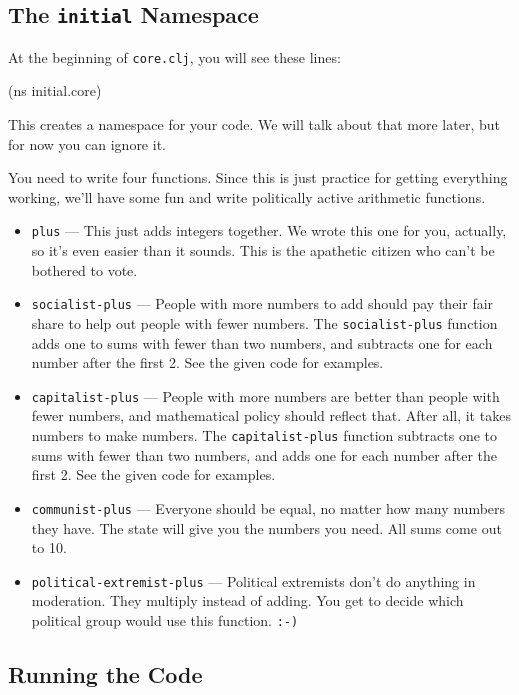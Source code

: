 \documentclass[12pt]{article}
\begin{document}
\subsection{The \texttt{initial} Namespace}

At the beginning of \texttt{core.clj}, you will see these lines:

\begin{clojurecode}
(ns initial.core)
\end{clojurecode}

This creates a namespace for your code.  We will talk about that more later, but for now you can
ignore it.

You need to write four functions.  Since this is just practice for getting everything working, we'll
have some fun and write politically active arithmetic functions.

\begin{itemize}
   \item \texttt{plus} --- This just adds integers together.  We wrote this one for you, actually, so it's even
      easier than it sounds.  This is the apathetic citizen who can't be bothered to vote.
   \item \texttt{socialist-plus} ---  People with more numbers to add should pay their fair share to help out
      people with fewer numbers.  The \texttt{socialist-plus} function adds one to sums with fewer than two
      numbers, and subtracts one for each number after the first 2.  See the given code for examples.
   \item \texttt{capitalist-plus} ---  People with more numbers are better than people with fewer numbers, and
      mathematical policy should reflect that.  After all, it takes numbers to make numbers.
      The \texttt{capitalist-plus} function subtracts one to sums with fewer than two
      numbers, and adds one for each number after the first 2.  See the given code for examples.
   \item \texttt{communist-plus} --- Everyone should be equal, no matter how many numbers they have.  The state
      will give you the numbers you need.  All sums come out to 10.
   \item \texttt{political-extremist-plus} --- Political extremists don't do anything in moderation.  They
      multiply instead of adding.  You get to decide which political group would use this function. \verb|:-)|

\end{itemize}

\subsection{Running the Code}
\end{document}

